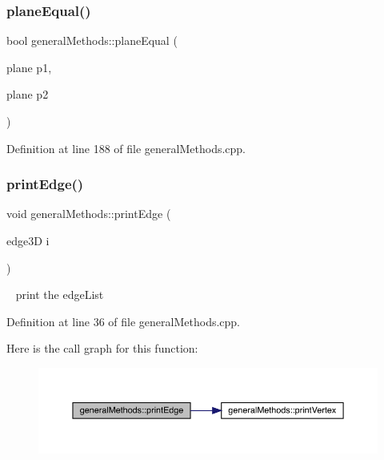 \subsubsection{\texorpdfstring{plane\+Equal()}{planeEqual()}}
{\footnotesize\ttfamily bool general\+Methods\+::plane\+Equal (\begin{DoxyParamCaption}\item[{plane}]{p1,  }\item[{plane}]{p2 }\end{DoxyParamCaption})}



Definition at line 188 of file general\+Methods.\+cpp.

\mbox{\label{namespacegeneral_methods_af9a1c28dacf89e746b51916fe178ce1a}} 
\subsubsection{\texorpdfstring{print\+Edge()}{printEdge()}}
{\footnotesize\ttfamily void general\+Methods\+::print\+Edge (\begin{DoxyParamCaption}\item[{edge3D}]{i }\end{DoxyParamCaption})}

~\newline
print the edge\+List

Definition at line 36 of file general\+Methods.\+cpp.

Here is the call graph for this function\+:
\nopagebreak
\begin{figure}[H]
\begin{center}
\leavevmode
\includegraphics[width=350pt]{namespacegeneral_methods_af9a1c28dacf89e746b51916fe178ce1a_cgraph}
\end{center}
\end{figure}
\mbox{\label{namespacegeneral_methods_ab6b6f8a5d92b39ead6c97ec0917b75a4}} 
